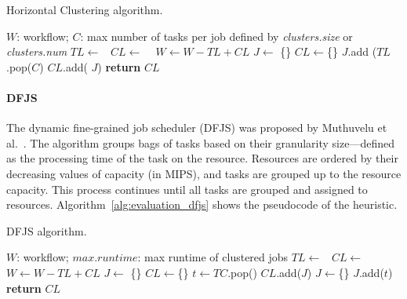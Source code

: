 \documentclass[final,5p,times,twocolumn]{elsarticle}
\begin{document}
\begin{algorithm}[!htb]
	\footnotesize
	\caption{Horizontal Clustering algorithm.}
	\label{alg:evaluation_hc}
	\begin{algorithmic}[1]
		\Require $W$: workflow; $C$: max number of tasks per job defined by \emph{clusters.size} or \emph{clusters.num}
				\State $TL\gets $\  
				\State $CL\gets$  \  
				\State $W \gets W - TL + CL$   
			\EndFor
		\EndProcedure
			\State $J\gets$ \{\}
			\State $CL\gets$\{\}
				\State $J$.add ($TL$.pop($C$) 
				\State  $CL$.add( $J$)
			\EndWhile
			\State \textbf{return} $CL$
		\EndProcedure
	\end{algorithmic}
\end{algorithm}

\paragraph{\textbf{DFJS}}
The dynamic fine-grained job scheduler (DFJS) was proposed by Muthuvelu et al.~\cite{Muthuvelu:2005:DJG:1082290.1082297}. The algorithm groups bags of tasks based on their granularity size---defined as the processing time of the task on the resource. Resources are ordered by their decreasing values of capacity (in MIPS), and tasks are grouped up to the resource capacity. This process continues until all tasks are grouped and assigned to resources. Algorithm~\ref{alg:evaluation_dfjs} shows the pseudocode of the heuristic. 
 
\begin{algorithm}[!htb]
	\caption{ DFJS algorithm.}
	\footnotesize
	\label{alg:evaluation_dfjs}
	\begin{algorithmic}[1]
		\Require $W$: workflow; $max.runtime$: max runtime of clustered jobs 
				\State $TL\gets $\  
				\State $CL\gets$  \  
				\State $W \gets W - TL + CL$   
			\EndFor
		\EndProcedure
			\State $J\gets$ \{\}
			\State $CL\gets$\{\}
				\State $t \gets TC$.pop() 
				\State	$CL$.add($J$)
				\State	$J \gets$\{\}
				\EndIf	
				\State $J$.add($t$)
			\EndWhile
			\State \textbf{return} $CL$
		\EndProcedure
	\end{algorithmic}
\end{algorithm}
\end{document}
